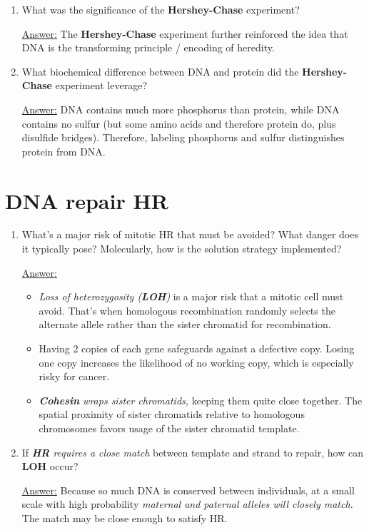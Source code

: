 \documentclass{article}
\newenvironment{QandA}{\begin{enumerate}[label=\bfseries Q\arabic*.]}
                       {\end{enumerate}}
\newenvironment{answered}{\par\normalfont\underline{Answer:}}{}
\begin{document}
\begin{QandA}
\begin{answered}
\begin{itemize}
      \item{4. Sulfur outside $\implies$ protein doesn't really enter.}
      \item{5. Phosphorus inside $\implies$ DNA does enter the cell.}
    \end{itemize}
    \end{answered}
  \item{What was the significance of the \textbf{Hershey-Chase} experiment?}
    \begin{answered}
    The \textbf{Hershey-Chase} experiment further reinforced the idea that DNA is the transforming principle / encoding of heredity.
    \end{answered}
  \item{What biochemical difference between DNA and protein did the \textbf{Hershey-Chase} experiment leverage?}
    \begin{answered}
    DNA contains much more phosphorus than protein, while DNA contains no sulfur (but some amino acids and therefore protein do, plus disulfide bridges). Therefore, labeling phosphorus and sulfur distinguishes protein from DNA.
    \end{answered}
\end{QandA}
\section{DNA repair HR}
\begin{QandA}
  \item{What's a major risk of mitotic HR that must be avoided? What danger does it typically pose? Molecularly, how is the solution strategy implemented?}
    \begin{answered}
    \begin{itemize}
      \item{\textit{Loss of heterozygosity (\textbf{LOH})} is a major risk that a mitotic cell must avoid. That's when homologous recombination randomly selects the alternate allele rather than the sister chromatid for recombination.}
      \item{Having 2 copies of each gene safeguards against a defective copy. Losing one copy increases the likelihood of no working copy, which is especially risky for cancer.}
      \item{\textit{\textbf{Cohesin} wraps sister chromatids,} keeping them quite close together. The spatial proximity of sister chromatids relative to homologous chromosomes favors usage of the sister chromatid template.}
    \end{itemize}
    \end{answered}
  \item{If \textit{\textbf{HR} requires a close match} between template and strand to repair, how can \textbf{LOH} occur?}
    \begin{answered}
    Because so much DNA is conserved between individuals, at a small scale with high probability \textit{maternal and paternal alleles will closely match.} The match may be close enough to satisfy HR.
    \end{answered}
\end{QandA}
\end{document}
